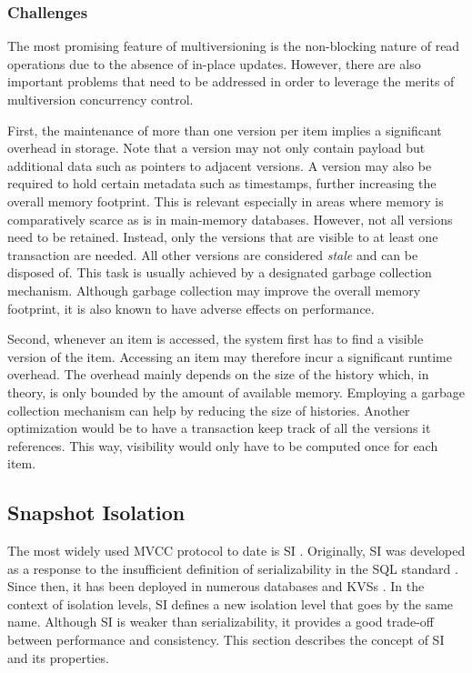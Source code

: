 \subsubsection{Challenges}

The most promising feature of multiversioning is the non-blocking nature of read
operations due to the absence of in-place updates. However, there are also
important problems that need to be addressed in order to leverage the merits of
multiversion concurrency control.

First, the maintenance of more than one version per item implies a significant
overhead in storage. Note that a version may not only contain payload but
additional data such as pointers to adjacent versions. A version may also be
required to hold certain metadata such as timestamps, further increasing the
overall memory footprint. This is relevant especially in areas where memory is
comparatively scarce as is in main-memory databases. However, not all versions
need to be retained. Instead, only the versions that are visible to at least one
transaction are needed. All other versions are considered \emph{stale} and can
be disposed of. This task is usually achieved by a designated garbage collection
mechanism. Although garbage collection may improve the overall memory footprint,
it is also known to have adverse effects on performance.

Second, whenever an item is accessed, the system first has to find a visible
version of the item. Accessing an item may therefore incur a significant runtime
overhead. The overhead mainly depends on the size of the history which, in
theory, is only bounded by the amount of available memory. Employing a garbage
collection mechanism can help by reducing the size of histories. Another
optimization would be to have a transaction keep track of all the versions it
references. This way, visibility would only have to be computed once for each
item.

\subsection{Snapshot Isolation}

The most widely used \ac{MVCC} protocol to date is \ac{SI} \cite{larson2011high,
neumann2015fast}. Originally, \ac{SI} was developed as a response to the
insufficient definition of serializability in the SQL standard
\cite{berenson1995critique}. Since then, it has been deployed in numerous
databases and \acp{KVS} \cite{cahill2009serializable, wu2017empirical}. In the
context of isolation levels, \ac{SI} defines a new isolation level that goes by
the same name. Although \ac{SI} is weaker than serializability, it provides a
good trade-off between performance and consistency. This section describes the
concept of \ac{SI} and its properties.

